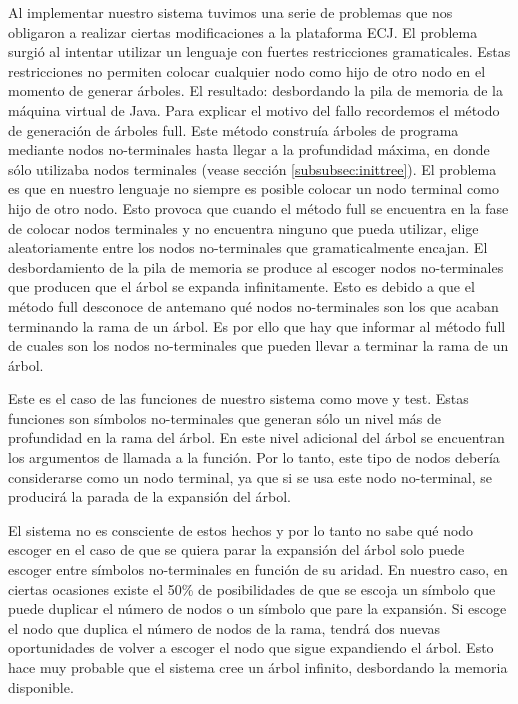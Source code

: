 Al implementar nuestro sistema tuvimos una serie de problemas que nos obligaron a
realizar ciertas modificaciones a la plataforma ECJ. El problema surgió al
intentar utilizar un lenguaje con fuertes restricciones gramaticales. Estas
restricciones no permiten colocar cualquier nodo como hijo de otro nodo en el
momento de generar árboles. El resultado: desbordando la pila de memoria de la
máquina virtual de Java. Para explicar el motivo del fallo recordemos el método
de generación de árboles full. Este método construía árboles de programa mediante
nodos no-terminales hasta llegar a la profundidad máxima, en donde sólo utilizaba
nodos terminales (vease sección \ref{subsubsec:inittree}). El problema es que en
nuestro lenguaje no siempre es posible colocar un nodo terminal como hijo de otro
nodo. Esto provoca que cuando el método full se encuentra en la fase de colocar
nodos terminales y no encuentra ninguno que pueda utilizar, elige aleatoriamente
entre los nodos no-terminales que gramaticalmente encajan. El desbordamiento de
la pila de memoria se produce al escoger nodos no-terminales que producen que el
árbol se expanda infinitamente. Esto es debido a que el método full desconoce de
antemano qué nodos no-terminales son los que acaban terminando la rama de un
árbol. Es por ello que hay que informar al método full de cuales son los nodos
no-terminales que pueden llevar a terminar la rama de un árbol.

Este es el caso de las funciones de nuestro sistema como move y test. Estas
funciones son símbolos no-terminales que generan sólo un nivel más de profundidad
en la rama del árbol. En este nivel adicional del árbol se encuentran los
argumentos de llamada a la función. Por lo tanto, este tipo de nodos debería
considerarse como un nodo terminal, ya que si se usa este nodo no-terminal, se
producirá la parada de la expansión del árbol.


El sistema no es consciente de estos hechos y por lo tanto no sabe qué nodo
escoger en el caso de que se quiera parar la expansión del árbol solo puede
escoger entre símbolos no-terminales en función de su aridad. En nuestro caso, en
ciertas ocasiones existe el 50\% de posibilidades de que se escoja un símbolo que
puede duplicar el número de nodos o  un símbolo que pare la expansión. Si escoge
el nodo que duplica el número de nodos de la rama, tendrá dos nuevas
oportunidades de volver a escoger el nodo que sigue expandiendo el árbol. Esto
hace muy probable que el sistema cree un árbol infinito, desbordando la memoria
disponible.

